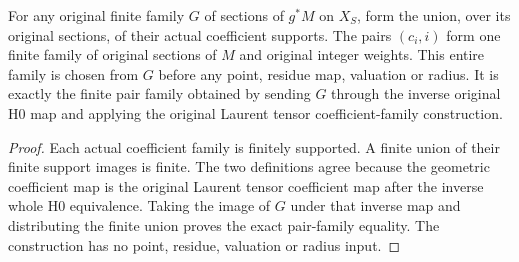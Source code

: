 \begin{definition}\label{def:fc-scheme-module-laurent-finite-coefficient-family}
\leanok
{}
For any original finite family $G$ of sections of $g^*M$ on $X_S$,
form the union, over its original sections, of their actual coefficient
supports. The pairs $(c_i,i)$ form one finite family of original
sections of $M$ and original integer weights. This entire family is
chosen from $G$ before any point, residue map, valuation or radius.
It is exactly the finite pair family obtained by sending $G$ through
the inverse original H0 map and applying the original Laurent tensor
coefficient-family construction.
\end{definition}
\begin{proof}
Each actual coefficient family is finitely supported. A finite union
of their finite support images is finite. The two definitions agree
because the geometric coefficient map is the original Laurent tensor
coefficient map after the inverse whole H0 equivalence. Taking the
image of $G$ under that inverse map and distributing the finite union
proves the exact pair-family equality. The construction has no point,
residue, valuation or radius input.
\end{proof}
